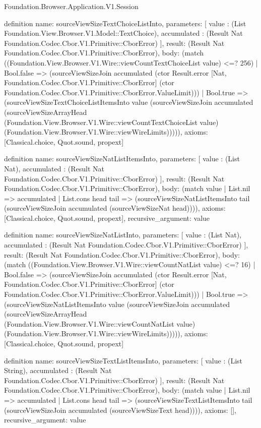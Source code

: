 \begin{lexlean}{Foundation.Browser.Application.V1.Session}
\begin{semanticmodule}
definition{
  name: sourceViewSizeTextChoiceListInto,
  parameters: [
    value : (List Foundation.View.Browser.V1.Model::TextChoice),
    accumulated : (Result Nat Foundation.Codec.Cbor.V1.Primitive::CborError)
  ],
  result: (Result Nat Foundation.Codec.Cbor.V1.Primitive::CborError),
  body: (match ((Foundation.View.Browser.V1.Wire::viewCountTextChoiceList value) <=? 256)
    | Bool.false => (sourceViewSizeJoin accumulated (ctor Result.error [Nat, Foundation.Codec.Cbor.V1.Primitive::CborError] (ctor Foundation.Codec.Cbor.V1.Primitive::CborError.ValueLimit)))
    | Bool.true => (sourceViewSizeTextChoiceListItemsInto value (sourceViewSizeJoin accumulated (sourceViewSizeArrayHead (Foundation.View.Browser.V1.Wire::viewCountTextChoiceList value) (Foundation.View.Browser.V1.Wire::viewWireLimits))))),
  axioms: [Classical.choice, Quot.sound, propext]
}

definition{
  name: sourceViewSizeNatListItemsInto,
  parameters: [
    value : (List Nat),
    accumulated : (Result Nat Foundation.Codec.Cbor.V1.Primitive::CborError)
  ],
  result: (Result Nat Foundation.Codec.Cbor.V1.Primitive::CborError),
  body: (match value
    | List.nil => accumulated
    | List.cons head tail => (sourceViewSizeNatListItemsInto tail (sourceViewSizeJoin accumulated (sourceViewSizeNat head)))),
  axioms: [Classical.choice, Quot.sound, propext],
  recursive_argument: value
}

definition{
  name: sourceViewSizeNatListInto,
  parameters: [
    value : (List Nat),
    accumulated : (Result Nat Foundation.Codec.Cbor.V1.Primitive::CborError)
  ],
  result: (Result Nat Foundation.Codec.Cbor.V1.Primitive::CborError),
  body: (match ((Foundation.View.Browser.V1.Wire::viewCountNatList value) <=? 16)
    | Bool.false => (sourceViewSizeJoin accumulated (ctor Result.error [Nat, Foundation.Codec.Cbor.V1.Primitive::CborError] (ctor Foundation.Codec.Cbor.V1.Primitive::CborError.ValueLimit)))
    | Bool.true => (sourceViewSizeNatListItemsInto value (sourceViewSizeJoin accumulated (sourceViewSizeArrayHead (Foundation.View.Browser.V1.Wire::viewCountNatList value) (Foundation.View.Browser.V1.Wire::viewWireLimits))))),
  axioms: [Classical.choice, Quot.sound, propext]
}

definition{
  name: sourceViewSizeTextListItemsInto,
  parameters: [
    value : (List String),
    accumulated : (Result Nat Foundation.Codec.Cbor.V1.Primitive::CborError)
  ],
  result: (Result Nat Foundation.Codec.Cbor.V1.Primitive::CborError),
  body: (match value
    | List.nil => accumulated
    | List.cons head tail => (sourceViewSizeTextListItemsInto tail (sourceViewSizeJoin accumulated (sourceViewSizeText head)))),
  axioms: [],
  recursive_argument: value
}


\end{semanticmodule}
\end{lexlean}
